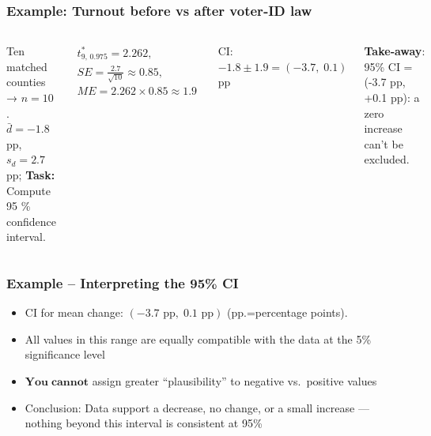 \documentclass[handout]{beamer}
\begin{document}
\begin{frame}
\frametitle{Example: Turnout before vs after voter‑ID law}
\begin{columns}[T]
  \small
  Ten matched counties → \(n=10\).  
  \(\bar d=-1.8\) pp, \(s_d=2.7\) pp; \textbf{Task:} Compute 95 \% confidence interval.  
  \pause

  \begin{align*}
      t^{\ast}_{9,\,0.975}=2.262, \\
      SE = \frac{2.7}{\sqrt{10}}\approx0.85, \\
      ME = 2.262\times0.85\approx1.9
  \end{align*}
  
  CI:\; \(-1.8\pm1.9 = (-3.7,\;0.1)\) pp

  \vspace{1ex}
  \textbf{Take‑away}: 95\% CI = (-3.7 pp, +0.1 pp): a zero increase can’t be excluded.
  
  \includegraphics[width=\textwidth]{Figures/paired_diff.pdf}
\end{columns}
\end{frame}

\begin{frame}
\frametitle{Example -- Interpreting the 95\% CI}
\begin{itemize}
  \item CI for mean change: \((-3.7 \text{ pp},\;0.1 \text{ pp})\)  (pp.=percentage points).
  \item All values in this range are equally compatible with the data at the 5\% significance level
  \item \(\mathbf{You\;cannot}\) assign greater ``plausibility” to negative vs.\ positive values
  \item Conclusion: Data support a decrease, no change, or a small increase — nothing beyond this interval is consistent at 95\%
\end{itemize}
\end{frame}
\end{document}
